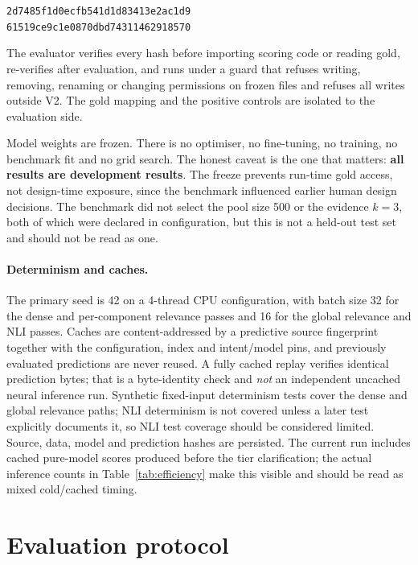 \documentclass[11pt,a4paper]{article}
\begin{document}
\begin{center}
\texttt{2d7485f1d0ecfb541d1d83413e2ac1d9}\\
\texttt{61519ce9c1e0870dbd74311462918570}
\end{center}

The evaluator verifies every hash before importing scoring code or reading gold, re-verifies after evaluation, and runs under a guard that refuses writing, removing, renaming or changing permissions on frozen files and refuses all writes outside V2. The gold mapping and the positive controls are isolated to the evaluation side.

Model weights are frozen. There is no optimiser, no fine-tuning, no training, no benchmark fit and no grid search. The honest caveat is the one that matters: \textbf{all results are development results}. The freeze prevents run-time gold access, not design-time exposure, since the benchmark influenced earlier human design decisions. The benchmark did not select the pool size 500 or the evidence $k=3$, both of which were declared in configuration, but this is not a held-out test set and should not be read as one.

\paragraph{Determinism and caches.} The primary seed is 42 on a 4-thread CPU configuration, with batch size 32 for the dense and per-component relevance passes and 16 for the global relevance and NLI passes. Caches are content-addressed by a predictive source fingerprint together with the configuration, index and intent/model pins, and previously evaluated predictions are never reused. A fully cached replay verifies identical prediction bytes; that is a byte-identity check and \emph{not} an independent uncached neural inference run. Synthetic fixed-input determinism tests cover the dense and global relevance paths; NLI determinism is not covered unless a later test explicitly documents it, so NLI test coverage should be considered limited. Source, data, model and prediction hashes are persisted. The current run includes cached pure-model scores produced before the tier clarification; the actual inference counts in Table~\ref{tab:efficiency} make this visible and should be read as mixed cold/cached timing.

\section{Evaluation protocol}
\label{sec:eval}
\end{document}
